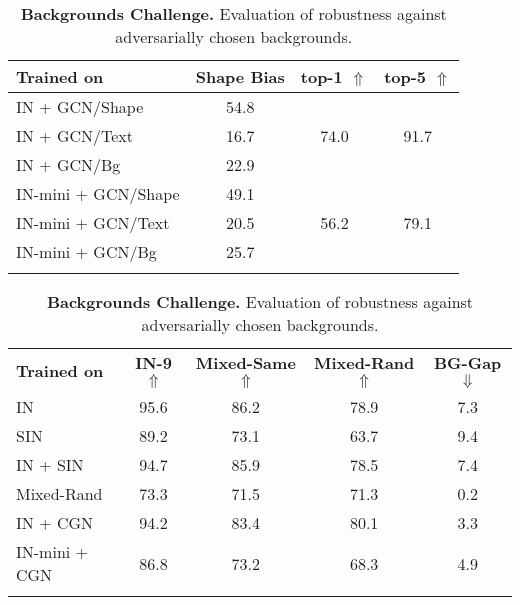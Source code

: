 \begin{table}[H]
    \begin{minipage}{.4\linewidth}
     \captionsetup{skip=1mm}
      \caption{\textbf{Shape vs. texture.} Evaluation of shape biases of independent classifiers.}
      \label{tab:mini-shape}
      \centering
\scriptsize
\setlength{\aboverulesep}{0.95pt}
\setlength{\belowrulesep}{0.95pt}
\begin{tabular}{lccc@{}}
\toprule
\textbf{Trained on} & \textbf{Shape Bias} & \textbf{top-1} $\Uparrow$ & \textbf{top-5} $\Uparrow$ \\ \midrule
\cellcolor{blue!10}IN + GCN/Shape & 54.8 & & \\
\arrayrulecolor{lightgray}\cmidrule(lr){2-2}
\cellcolor{blue!10}IN + GCN/Text & 16.7 & 74.0 & 91.7 \\
\arrayrulecolor{lightgray}\cmidrule(lr){2-2}
\cellcolor{blue!10}IN + GCN/Bg & 22.9 & & \\
\arrayrulecolor{black}\midrule
IN-mini + GCN/Shape & 49.1 & & \\
\arrayrulecolor{lightgray}\cmidrule(lr){2-2}
IN-mini + GCN/Text & 20.5 & 56.2 & 79.1 \\
\arrayrulecolor{lightgray}\cmidrule(lr){2-2}
IN-mini + GCN/Bg & 25.7 & & \\
\arrayrulecolor{black}\bottomrule
\end{tabular}

    \end{minipage}%
    \begin{minipage}{.6\linewidth}
      \centering
       \captionsetup{skip=1mm, width=.85\textwidth}
        \caption{\textbf{Backgrounds Challenge.} Evaluation of robustness against adversarially chosen backgrounds.}
        \scriptsize
        \setlength{\aboverulesep}{0.95pt}
        \setlength{\belowrulesep}{0.95pt}
        \label{tab:mini-classifiers}
\begin{tabular}{lcccc@{}}
\toprule
\textbf{Trained on} & \textbf{IN-9} $\Uparrow$ & \textbf{Mixed-Same} $\Uparrow$ & \textbf{Mixed-Rand} $\Uparrow$ & \textbf{BG-Gap} $\Downarrow$     \\ \arrayrulecolor{black}\midrule
\cellcolor{blue!10}IN & 95.6  & 86.2  & 78.9  & 7.3  \\ \arrayrulecolor{lightgray}
\cmidrule(l){2-5}
\cellcolor{blue!10}SIN &  89.2  & 73.1  & 63.7  &  9.4  \\ \arrayrulecolor{lightgray}\cmidrule(l){2-5}
\cellcolor{blue!10}IN + SIN & 94.7  &  85.9  & 78.5  & 7.4   \\ \arrayrulecolor{lightgray}\cmidrule(l){2-5}
\cellcolor{blue!10}Mixed-Rand & 73.3  & 71.5  & 71.3  & 0.2  \\
\arrayrulecolor{black}\midrule
\cellcolor{blue!10}IN + CGN & 94.2  & 83.4  & 80.1  & 3.3  \\
\arrayrulecolor{lightgray}\cmidrule(l){2-5}
IN-mini + CGN & 86.8 & 73.2 & 68.3 & 4.9 \\
\arrayrulecolor{black}\bottomrule
\end{tabular}

    \end{minipage}
\end{table}
